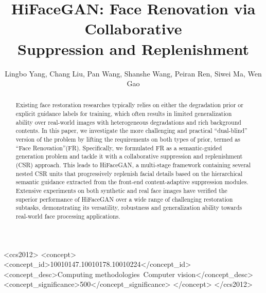 \documentclass[sigconf]{acmart}
\begin{document}
\title{HiFaceGAN: Face Renovation via Collaborative\\ Suppression and Replenishment}




\author{Lingbo Yang, Chang Liu, Pan Wang, Shanshe Wang, Peiran Ren, Siwei Ma, Wen Gao}




\def\TODO[#1]{\textcolor{red}{#1}}
\def\NOTE[#1]{(\textcolor{blue}{#1})}


\def \etal{~\emph{et. al. }}
\def \L{\mathcal{L}}

\def \check {}
\def \cross {}


\renewcommand{\shortauthors}{Anonymous}

\begin{abstract}

Existing face restoration researches typically relies on either the degradation prior or explicit guidance labels for training, which often results in limited generalization ability over real-world images with heterogeneous degradations and rich background contents. In this paper, we investigate the more challenging and practical ``dual-blind'' version of the problem by lifting the requirements on both types of prior, termed as ``Face Renovation''(FR). Specifically, we formulated FR as a semantic-guided generation problem and tackle it with a collaborative suppression and replenishment (CSR) approach. This leads to HiFaceGAN, a multi-stage framework containing several nested CSR units that progressively replenish facial details based on the hierarchical semantic guidance extracted from the front-end content-adaptive suppression modules. Extensive experiments on both synthetic and real face images have verified the superior performance of HiFaceGAN over a wide range of challenging restoration subtasks, demonstrating its versatility, robustness and generalization ability towards real-world face processing applications.

\end{abstract}

\begin{CCSXML}
<ccs2012>
<concept>
<concept_id>10010147.10010178.10010224</concept_id>
<concept_desc>Computing methodologies~Computer vision</concept_desc>
<concept_significance>500</concept_significance>
</concept>
</ccs2012>
\end{CCSXML}
\end{document}
